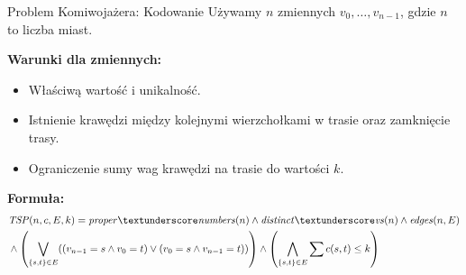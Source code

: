 \begin{frame}{Problem Komiwojażera: Kodowanie}
Używamy $n$ zmiennych $v_0,…, v_{n−1}$, gdzie $n$ to liczba miast.
\vspace{10pt}

\textbf{Warunki dla zmiennych:}
\vspace{5pt}
\begin{itemize}
	\item Właściwą wartość i unikalność.
	\item Istnienie krawędzi między kolejnymi wierzchołkami w trasie oraz zamknięcie trasy.
	\item Ograniczenie sumy wag krawędzi na trasie do wartości $k$.
\end{itemize}

\vspace{10pt}
\textbf{Formuła:}	
\begin{align*}
	&\TSP(n, c, E, k) = \propernumbers(n) \land \distinctvs(n) \land \edges(n, E)  \\
	&\land \left( \bigvee_{\{s,t\} \in E} ((v_{n-1} = s \land v_0 = t) \lor (v_0 = s \land v_{n-1} = t)) \right) \land 
	\left( \bigwedge_{\{s,t\} \in E} \sum c(s,t) \leq k \right)
\end{align*}
	
\end{frame}